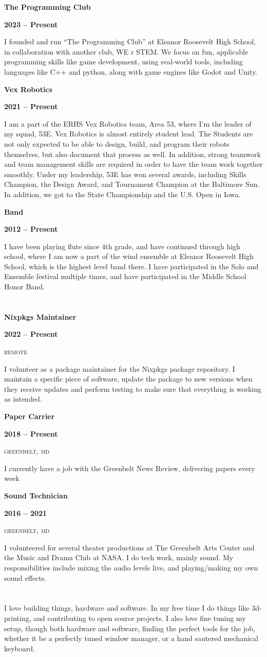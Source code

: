 \documentclass[12pt]{article}
\newcommand{\mainColor}{blueSky} %
\newcommand{\negshspace}{\hspace*{-0.5em}}
\newcommand{\neghvspace}{\vspace*{-1.5em}}
\newcommand{\svspace}{\vspace*{0.5em}}
\newcommand{\boxAwesome}[1]{
	\makebox[1.50em][c]{
		#1
	}
}
\newcommand{\cvsection}[2]{
	\section*{
	  \color{\mainColor} \boxAwesome{#1} \negshspace \StrSplit{#2}{3}{\csA}{\csB} \csA\color{black}\csB
	 }
}
\newcommand{\work}[4]{
	\noindent \textbf{#1}
	\hfill %
	\parbox{8em}{
		\centering\textbf{#2}
	} \par
	\noindent \color{grayShy} \textsc{\MakeLowercase{#3}} \color{black} \par
	#4
	\normalsize \par
}
\newcommand{\activity}[3]{
	\noindent \textbf{#1}
	\hfill %
	\parbox{8em}{
		\centering\textbf{#2}
	} \par
	#3
	\normalsize \par
}
\begin{document}
\activity{The Programming Club}{2023 -- Present}{I founded and run “The Programming Club” at Eleanor Roosevelt High School, in collaboration with another club, WE r STEM. We focus on fun, applicable programming skills like game development, using real-world tools, including languages like C++ and python, along with game engines like Godot and Unity. }
\activity{Vex Robotics}{2021 -- Present}{I am a part of the ERHS Vex Robotics team, Area 53, where I’m the leader of my squad, 53E. Vex Robotics is almost entirely student lead. The Students are not only expected to be able to design, build, and program their robots themselves, but also document that process as well. In addition, strong teamwork and team management skills are required in order to have the team work together smoothly. Under my leadership, 53E has won several awards, including Skills Champion, the Design Award, and Tournament Champion at the Baltimore Sun. In addition, we got to the State Championship and the U.S. Open in Iowa.}
\activity{Band}{2012 -- Present}{I have been playing flute since 4th grade, and have continued through high school, where I am now a part of the wind ensemble at Eleanor Roosevelt High School, which is the highest level band there. I have participated in the Solo and Ensemble festival multiple times, and have participated in the Middle School Honor Band.}


\neghvspace
\cvsection{\faBriefcase}{Work Experience}
\svspace

\work{Nixpkgs Maintainer}{2022 -- Present}{Remote}{I volunteer as a package maintainer for the Nixpkgs package repository. I maintain a specific piece of software, update the package to new versions when they receive updates and perform testing to make sure that everything is working as intended.}

\work{Paper Carrier}{2018 -- Present}{Greenbelt, MD}{I currently have a job with the Greenbelt News Review, delivering papers every week}

\work{Sound Technician}{2016 -- 2021}{Greenbelt, MD}{I volunteered for several theater productions at The Greenbelt Arts Center and the Music and Drama Club at NASA. I do tech work, mainly sound. My responsibilities include mixing the audio levels live, and playing/making my own sound effects.}


\neghvspace
\cvsection{\faPuzzlePiece}{Hobbies \& Interests}
\svspace

I love building things, hardware and software. In my free time I do things like 3d-printing, and contributing to open source projects. I also love fine tuning my setup, though both hardware and software, finding the perfect tools for the job, whether it be a perfectly tuned window manager, or a hand sautered mechanical keyboard.
\end{document}
